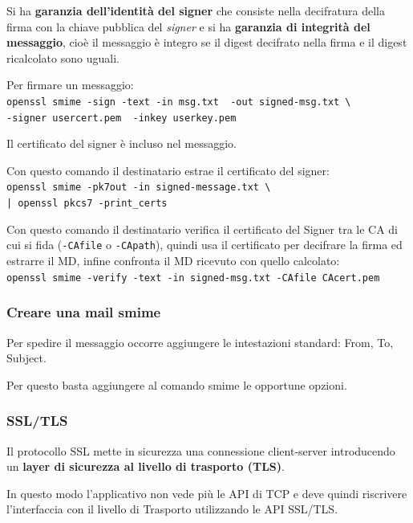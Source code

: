             Si ha \textbf{garanzia dell'identità del signer} che consiste nella decifratura della firma con la chiave pubblica del \textit{signer} e si ha \textbf{garanzia di integrità del messaggio}, cioè il messaggio è integro se il digest decifrato nella firma e il digest ricalcolato sono uguali.

            Per firmare un messaggio:\\
            \verb|openssl smime -sign -text -in msg.txt  -out signed-msg.txt \|\\
            \verb|-signer usercert.pem  -inkey userkey.pem|

            Il certificato del signer è incluso nel messaggio.

            Con questo comando il destinatario estrae il certificato del signer:\\
            \verb:openssl smime -pk7out -in signed-message.txt \:\\
            \verb:| openssl pkcs7 -print_certs:

            Con questo comando il destinatario verifica il certificato del Signer tra le CA di cui si fida (\verb|-CAfile| o \verb|-CApath|), quindi usa il certificato per decifrare la firma ed estrarre il MD, infine confronta il MD ricevuto con quello calcolato:\\
            \verb|openssl smime -verify -text -in signed-msg.txt -CAfile CAcert.pem|

        \subsubsection{Creare una mail smime}
            Per spedire il messaggio occorre aggiungere le intestazioni standard: From, To, Subject.
        
            Per questo basta aggiungere al comando smime le opportune opzioni.

            

        \subsubsection{SSL/TLS}
            Il protocollo SSL mette in sicurezza una connessione client-server introducendo un \textbf{layer di sicurezza al livello di trasporto (TLS)}.
        
            In questo modo l'applicativo non vede più le API di TCP e deve quindi riscrivere l'interfaccia con il livello di Trasporto utilizzando le API SSL/TLS.
        
